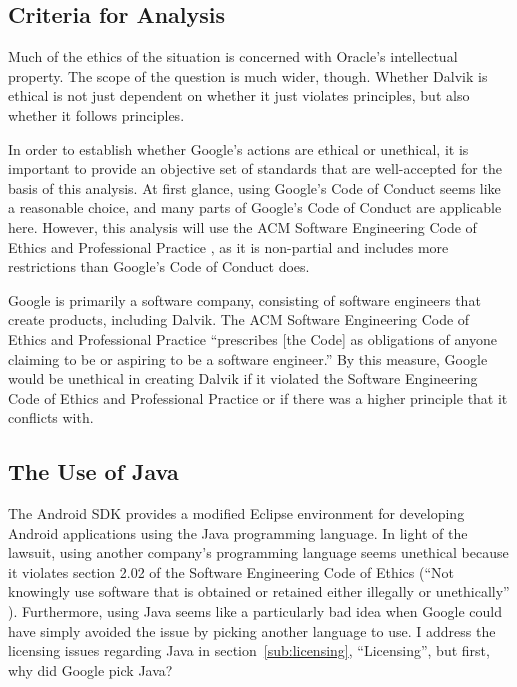 \documentclass[11pt]{article}
\begin{document}
\begin{multicols}{2}
\subsection{Criteria for Analysis} %
\label{sub:criteria}

Much of the ethics of the situation is concerned with Oracle's intellectual
property.  The scope of the question is much wider, though.  Whether Dalvik is
ethical is not just dependent on whether it just violates principles, but also
whether it follows principles.

In order to establish whether Google's actions are ethical or unethical, it is
important to provide an objective set of standards that are well-accepted for
the basis of this analysis.  At first glance, using Google's Code of Conduct
\cite{google-conduct} seems like a reasonable choice, and many parts of Google's
Code of Conduct are applicable here.  However, this analysis will use the ACM
Software Engineering Code of Ethics and Professional Practice \cite{secode}, as
it is non-partial and includes more restrictions than Google's Code of Conduct
does.

Google is primarily a software company, consisting of software engineers that
create products, including Dalvik.  The ACM Software Engineering Code of Ethics
and Professional Practice ``prescribes [the Code] as obligations of anyone
claiming to be or aspiring to be a software engineer.'' \cite{secode} By this
measure, Google would be unethical in creating Dalvik if it violated the
Software Engineering Code of Ethics and Professional Practice \cite{secode} or
if there was a higher principle that it conflicts with.


\subsection{The Use of Java} %
\label{sub:java}

The Android SDK provides a modified Eclipse environment for developing Android
applications using the Java programming language.  In light of the lawsuit,
using another company's programming language seems unethical because it violates
section 2.02 of the Software Engineering Code of Ethics (``Not knowingly use
software that is obtained or retained either illegally or unethically'' \cite[\S
2.02]{secode}).  Furthermore, using Java seems like a particularly bad idea when
Google could have simply avoided the issue by picking another language to use.
I address the licensing issues regarding Java in section~\ref{sub:licensing},
``Licensing'', but first, why did Google pick Java?


\end{multicols}
\end{document}

